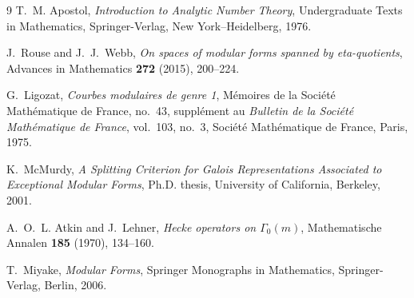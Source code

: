 \documentclass[12pt, a4paper]{amsart}
\theoremstyle{definition}
\numberwithin{theorem}{section}
\begin{document}
\begin{thebibliography}{9}
T.~M. Apostol, \emph{Introduction to Analytic Number Theory}, Undergraduate Texts in Mathematics, Springer-Verlag, New York--Heidelberg, 1976.

J.~Rouse and J.~J.~Webb, \emph{On spaces of modular forms spanned by eta-quotients}, Advances in Mathematics \textbf{272} (2015), 200--224.

G.~Ligozat, \emph{Courbes modulaires de genre 1}, Mémoires de la Société Mathématique de France, no.~43, supplément au \emph{Bulletin de la Société Mathématique de France}, vol.~103, no.~3, Société Mathématique de France, Paris, 1975.

K.~McMurdy, \emph{A Splitting Criterion for Galois Representations Associated to Exceptional Modular Forms}, Ph.D. thesis, University of California, Berkeley, 2001.

 A.~O.~L. Atkin and J.~Lehner, \emph{Hecke operators on \(\Gamma_0\left(m\right)\)}, Mathematische Annalen \textbf{185} (1970), 134--160.

T.~Miyake, \emph{Modular Forms}, Springer Monographs in Mathematics, Springer-Verlag, Berlin, 2006.
\end{thebibliography}
\end{document}
